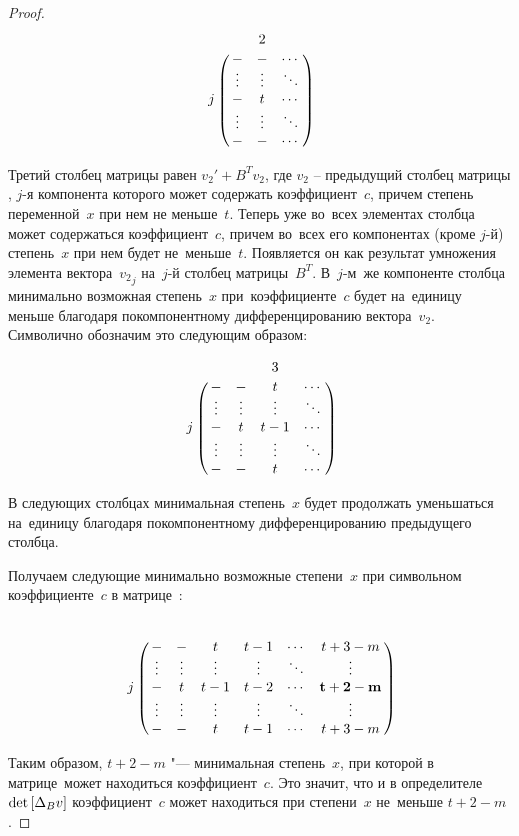 \begin{proof}
\begin{equation*}
    \bordermatrix{
		&           & 2       &        \cr
		&   -       & -       & \cdots \cr
		&   \vdots  & \vdots  & \ddots \cr
		j & -       & t       & \cdots \cr
		&   \vdots  & \vdots  & \ddots \cr
		&   -       & -       & \cdots \cr
	}
\end{equation*}

Третий столбец матрицы равен $v_2' + {B}^Tv_2$, где $v_2$ -- предыдущий столбец матрицы \diffMatrix[B], $j$-я компонента которого может содержать коэффициент~$c$,
причем степень переменной~$x$ при нем не меньше~$t$.
Теперь уже во~всех элементах столбца может содержаться коэффициент~$c$, причем во~всех его компонентах (кроме $j$-й) степень~$x$ при нем будет не~меньше~$t$.
Появляется он как результат умножения элемента вектора~${v_2}_j$ на~$j$-й столбец матрицы~$B^T$.
В~$j$-м~же компоненте столбца минимально возможная степень~$x$ при~коэффициенте~$c$ будет на~единицу меньше благодаря покомпонентному дифференцированию вектора~$v_2$.
Символично обозначим это следующим образом:

\begin{equation*}
    \bordermatrix{
		&           &         & 3      &        \cr
		&   -       & -       & t      & \cdots \cr
		&   \vdots  & \vdots  & \vdots & \ddots \cr
		j & -       & t       & t - 1  & \cdots \cr
		&   \vdots  & \vdots  & \vdots & \ddots \cr
		&   -       & -       & t      & \cdots \cr
	}
\end{equation*}

В следующих столбцах минимальная степень~$x$ будет продолжать уменьшаться на~единицу благодаря покомпонентному дифференцированию предыдущего столбца.

Получаем следующие минимально возможные степени~$x$ при символьном коэффициенте~$c$ в матрице~\diffMatrix[B]:

\begin{equation*}
    \bordermatrix{
		&           &         &        &        &        &           \cr
		&   -       & -       & t      & t - 1  & \cdots & t + 3 - m \cr
		&   \vdots  & \vdots  & \vdots & \vdots & \ddots & \vdots    \cr
		j & -       & t       & t - 1  & t - 2  & \cdots & \mathbf{t + 2 - m} \cr
		&   \vdots  & \vdots  & \vdots & \vdots & \ddots & \vdots    \cr
		&   -       & -       & t      & t - 1  & \cdots & t + 3 - m \cr
	}
\end{equation*}

Таким образом, $t + 2 - m$ "--- минимальная степень~$x$, при которой в матрице~\diffMatrix[B] может находиться коэффициент~$c$.
Это значит, что и в определителе $\mathop{\rm det} \text{$ [\Delta_B v] $}$ коэффициент~$c$ может находиться при степени~$x$ не~меньше $t + 2 - m$.


\end{proof}
